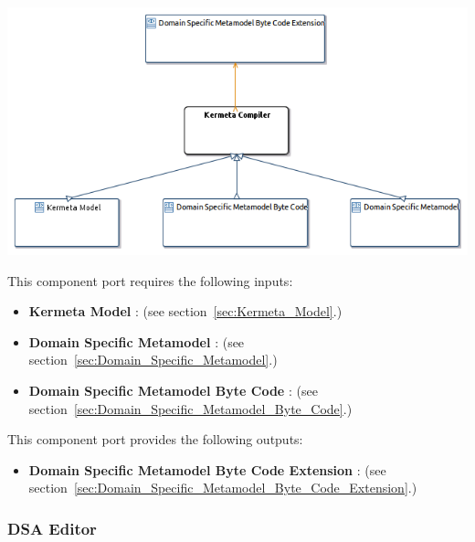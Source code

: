 \documentclass{gemoc} %
\begin{document}

\begin{center}
\includegraphics*[trim=0.0cm 0.0cm 0cm 0.0cm, clip=true]{../images/generated/Generated_Kermeta_Compiler.png}
\end{center}

This component port requires the following inputs:
\begin{itemize}
  \item \textbf{Kermeta Model} :
(see section~\ref{sec:Kermeta_Model}.)
  \item \textbf{Domain Specific Metamodel} :
(see section~\ref{sec:Domain_Specific_Metamodel}.)
  \item \textbf{Domain Specific Metamodel Byte Code} :
(see section~\ref{sec:Domain_Specific_Metamodel_Byte_Code}.)
\end{itemize}

This component port provides the following outputs:
\begin{itemize}
  \item \textbf{Domain Specific Metamodel Byte Code Extension} :
(see section~\ref{sec:Domain_Specific_Metamodel_Byte_Code_Extension}.)
\end{itemize}



\subsubsection{DSA Editor}
\label{sec:DSA_Editor}
\end{document}
